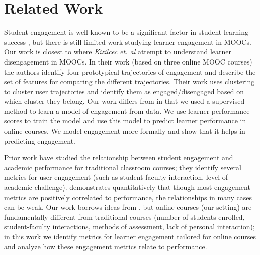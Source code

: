 \section{Related Work}
\label{sec:related work}
Student engagement is well known to be a significant factor in student learning success \cite{kuh}, but there is still limited work studying learner engagement in MOOCs. Our work is closest to \cite{kizilcec} where {\it Kizilcec et. al} attempt to understand learner disengagement in MOOCs. In their work (based on three online MOOC courses) the authors identify four prototypical trajectories of engagement and describe the set of features for comparing the different trajectories. Their work uses clustering to cluster user trajectories and identify them as engaged/disengaged based on which cluster they belong. Our work differs from \cite{kizilcec} in that we used a supervised method to learn a model of engagement from data. We use learner performance scores to train the model and use this model to predict learner performance in online courses. We model engagement more formally and show that it helps in predicting engagement.

Prior work \cite{kuh, carini} have studied the relationship between student engagement and academic performance for traditional classroom courses; they identify several metrics for user engagement (such as student-faculty interaction, level of academic challenge). \cite{carini} demonstrates quantitatively that though most engagement metrics are positively correlated to performance, the relationships in many cases can be weak. Our work borrows ideas from  \cite{kuh, carini}, but  online courses (our setting) are fundamentally different from traditional courses (number of students enrolled, student-faculty interactions, methods of assessment, lack of personal interaction); in this work we identify  metrics for learner engagement tailored for online courses and analyze how these engagement metrics relate to performance.